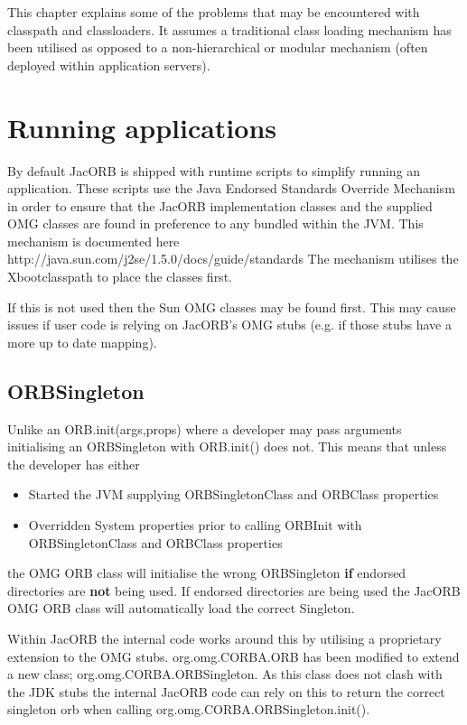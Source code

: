 %
%
\label{classloader}
This chapter explains some of the problems that may be encountered with classpath and classloaders.
It assumes a traditional class loading mechanism has been utilised as opposed
to a non-hierarchical or modular mechanism (often deployed within application servers).

\section{Running applications}
\label{appRunningEndorsed}

By default JacORB is shipped with runtime scripts to simplify running
an application.  These scripts use the Java Endorsed Standards
Override Mechanism in order to ensure that the JacORB implementation
classes and the supplied OMG classes are found in preference to any
bundled within the JVM. This mechanism is documented here
http://java.sun.com/j2se/1.5.0/docs/guide/standards The mechanism
utilises the Xbootclasspath to place the classes first.

If this is not used then the Sun OMG classes may be found first. This may cause
issues if user code is relying on JacORB's OMG stubs (e.g. if those stubs have a
more up to date mapping).

\subsection{ORBSingleton}
Unlike an ORB.init(args,props) where a developer may pass arguments initialising
an ORBSingleton with ORB.init() does not. This means that unless the developer has
either

\begin{itemize}
\item Started the JVM supplying ORBSingletonClass and ORBClass properties
\item Overridden System properties prior to calling ORBInit with ORBSingletonClass and ORBClass properties
\end{itemize}

the OMG ORB class will initialise the wrong ORBSingleton \textbf{if} endorsed
directories are \textbf{not} being used. If endorsed directories are being used
the JacORB OMG ORB class will automatically load the correct Singleton.

Within JacORB the internal code works around this by utilising a proprietary
extension to the OMG stubs.  org.omg.CORBA.ORB has been modified to extend a new
class; org.omg.CORBA.ORBSingleton. As this class does not clash with the JDK
stubs the internal JacORB code can rely on this to return the correct singleton
orb when calling org.omg.CORBA.ORBSingleton.init().

